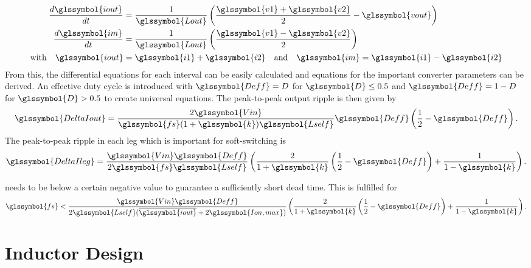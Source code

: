 \documentclass{IPEC2026}
\newcommand{\sbl}[1]{\glssymbol{#1}}
\begin{document}
\begin{equation}
  \label{eq:TransformerModel}
  \begin{aligned}
    \frac{d\sbl{iout}}{dt} &= \frac{1}{\sbl{Lout}} \left (\frac{\sbl{v1} + \sbl{v2}}{2}-\sbl{vout} \right ) \\
    \frac{d\sbl{im}}{dt} &= \frac{1}{\sbl{Lout}} \left (\frac{\sbl{v1} - \sbl{v2}}{2} \right ) \\
    \text{with} \quad \sbl{iout} &= \sbl{i1} + \sbl{i2} \quad \text{and} \quad \sbl{im} = \sbl{i1} - \sbl{i2}
  \end{aligned}
\end{equation}
From this, the differential equations for each interval can be easily calculated and equations for the important converter parameters can be derived. An effective duty cycle \sbl{Deff} is introduced with $\sbl{Deff} = D$ for $\sbl{D} \leq 0.5$ and $\sbl{Deff} = 1-D$ for $\sbl{D} > 0.5$ to create universal equations. The peak-to-peak output ripple is then given by
\begin{equation}
  \sbl{DeltaIout} = \frac{2\sbl{Vin}}{\sbl{fs}(1+\sbl{k})\sbl{Lself}}\sbl{Deff}\left (\frac{1}{2}-\sbl{Deff} \right ).
  \label{eq:DeltaIout}
\end{equation}
The peak-to-peak ripple in each leg which is important for soft-switching is
\begin{equation}
  \sbl{DeltaIleg} =  \frac{\sbl{Vin}\sbl{Deff}}{2\sbl{fs}\sbl{Lself}} \left (\frac{2}{1+\sbl{k}} \left (\frac{1}{2}-\sbl{Deff} \right ) + \frac{1}{1-\sbl{k}} \right ).
  \label{eq:DeltaIleg}
\end{equation}

\sbl{Ion} needs to be below a certain negative value \sbl{Ion,max} to guarantee a sufficiently short dead time. This is fulfilled for
\begin{equation}
    \sbl{fs} < \frac{\sbl{Vin}\sbl{Deff}}{2\sbl{Lself}(\overline{\sbl{iout}}+2\sbl{Ion,max})} \left (\frac{2}{1+\sbl{k}}\left (\frac{1}{2}-\sbl{Deff} \right ) + \frac{1}{1-\sbl{k}} \right ).
    \label{eq:ConditionZVS}
\end{equation}

\section{Inductor Design}
\end{document}
